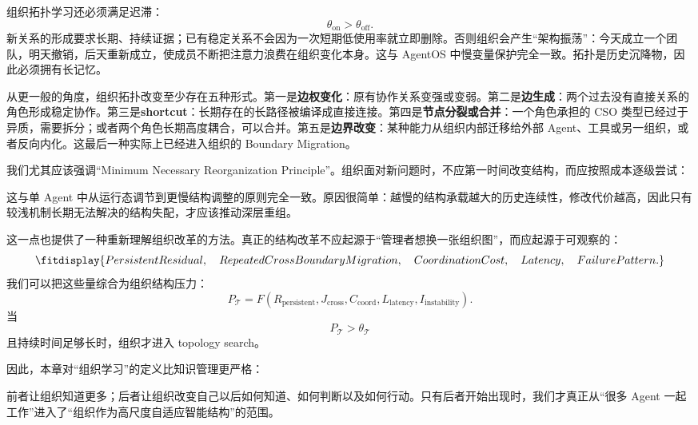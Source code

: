 组织拓扑学习还必须满足迟滞：
\[
\theta_{\mathrm{on}}
>
\theta_{\mathrm{off}}.
\]
新关系的形成要求长期、持续证据；已有稳定关系不会因为一次短期低使用率就立即删除。否则组织会产生“架构振荡”：今天成立一个团队，明天撤销，后天重新成立，使成员不断把注意力浪费在组织变化本身。这与 AgentOS 中慢变量保护完全一致。拓扑是历史沉降物，因此必须拥有长记忆。

从更一般的角度，组织拓扑改变至少存在五种形式。第一是\textbf{边权变化}：原有协作关系变强或变弱。第二是\textbf{边生成}：两个过去没有直接关系的角色形成稳定协作。第三是\textbf{shortcut}：长期存在的长路径被编译成直接连接。第四是\textbf{节点分裂或合并}：一个角色承担的 CSO 类型已经过于异质，需要拆分；或者两个角色长期高度耦合，可以合并。第五是\textbf{边界改变}：某种能力从组织内部迁移给外部 Agent、工具或另一组织，或者反向内化。这最后一种实际上已经进入组织的 Boundary Migration。

我们尤其应该强调“Minimum Necessary Reorganization Principle”。组织面对新问题时，不应第一时间改变结构，而应按照成本逐级尝试：
\begin{statementbox}
\centering
{}
\end{statementbox}
这与单 Agent 中从运行态调节到更慢结构调整的原则完全一致。原因很简单：越慢的结构承载越大的历史连续性，修改代价越高，因此只有较浅机制长期无法解决的结构失配，才应该推动深层重组。

这一点也提供了一种重新理解组织改革的方法。真正的结构改革不应起源于“管理者想换一张组织图”，而应起源于可观察的：
\[
\fitdisplay{
PersistentResidual,
\quad
RepeatedCrossBoundaryMigration,
\quad
CoordinationCost,
\quad
Latency,
\quad
FailurePattern.
}
\]
我们可以把这些量综合为组织结构压力：
\[
P_{\mathcal T}
=
F(
R_{\mathrm{persistent}},
J_{\mathrm{cross}},
C_{\mathrm{coord}},
L_{\mathrm{latency}},
I_{\mathrm{instability}}
).
\]
当
\[
P_{\mathcal T}>\theta_{\mathcal T}
\]
且持续时间足够长时，组织才进入 topology search。

因此，本章对“组织学习”的定义比知识管理更严格：
\begin{statementbox}
\centering
{}
\end{statementbox}
前者让组织知道更多；后者让组织改变自己以后如何知道、如何判断以及如何行动。只有后者开始出现时，我们才真正从“很多 Agent 一起工作”进入了“组织作为高尺度自适应智能结构”的范围。


